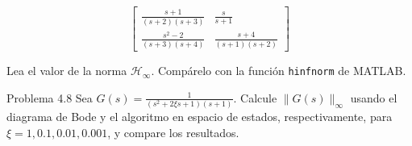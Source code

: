 $$
\left[\begin{array}{cc}
\frac{s+1}{(s+2)(s+3)} & \frac{s}{s+1} \\
\frac{s^{2}-2}{(s+3)(s+4)} & \frac{s+4}{(s+1)(s+2)}
\end{array}\right]
$$

Lea el valor de la norma $\mathcal{H}_{\infty}$. Compárelo con la función \texttt{hinfnorm} de MATLAB.

Problema 4.8 Sea $G(s)=\frac{1}{\left(s^{2}+2 \xi s+1\right)(s+1)}$. Calcule $\|G(s)\|_{\infty}$ usando el diagrama de Bode y el algoritmo en espacio de estados, respectivamente, para $\xi=1,0.1,0.01,0.001$, y compare los resultados.
